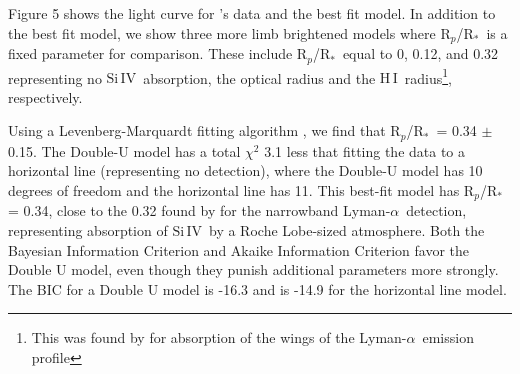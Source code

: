 \documentclass[manuscript]{aastex}
\newcommand{\hi}{\ensuremath{\mathrm{H}\,\scriptstyle \mathrm{I}}}
\newcommand{\siIV}{\ensuremath{\mathrm{Si}\,\scriptstyle \mathrm{IV}}}
\newcommand{\p}{R$_p$/R$_*$}
\newcommand{\lya}{Lyman-$\alpha$}
\begin{document}
Figure 5
 shows the light curve for \citet{vidmad}'s data and the best fit model. In addition to the best fit model, we show three more limb brightened models where \p\ is a fixed parameter for comparison. These include \p\ equal to 0, 0.12, and 0.32 representing no \siIV\ absorption, the optical radius \citep{knutsonprop} and the \hi\ radius\footnote{This was found by \citet{vidmad} for absorption of the wings of the \lya\ emission profile}, respectively.

Using a Levenberg-Marquardt fitting algorithm \citep{mpfit}, we find that \p\ = 0.34 $\pm$ 0.15. 
The Double-U model has a total $\chi^2$ 3.1 less that fitting the data to
a horizontal line (representing no detection), where the Double-U model has 10 degrees of freedom and the horizontal line has 11. This best-fit model has
R$_p$/R$_*$ = 0.34, close to the 0.32 found by \citet{vidmad} for the narrowband \lya\ detection, representing absorption of \siIV\ by a Roche Lobe-sized atmosphere. Both the Bayesian Information Criterion and Akaike Information Criterion favor the Double U model, even though they punish additional parameters more strongly. The BIC for a Double U model is -16.3 and is -14.9 for the horizontal line model.

\end{document}
